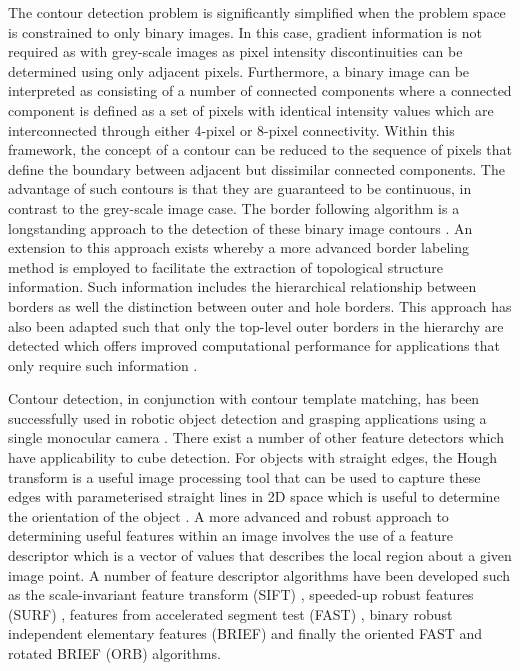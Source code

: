 The contour detection problem is significantly simplified when the problem space is constrained to only binary images. In this case, gradient information is not required as with grey-scale images as pixel intensity discontinuities can be determined using only adjacent pixels. Furthermore, a binary image can be interpreted as consisting of a number of connected components where a connected component is defined as a set of pixels with identical intensity values which are interconnected through either 4-pixel or 8-pixel connectivity. Within this framework, the concept of a contour can be reduced to the sequence of pixels that define the boundary between adjacent but dissimilar connected components. The advantage of such contours is that they are guaranteed to be continuous, in contrast to the grey-scale image case. The border following algorithm is a longstanding approach to the detection of these binary image contours \cite{Suzuki:Binary_Image_Topological_Structural_Analysis}. An extension to this approach exists whereby a more advanced border labeling method is employed to facilitate the extraction of topological structure information. Such information includes the hierarchical relationship between borders as well the distinction between outer and hole borders. This approach has also been adapted such that only the top-level outer borders in the hierarchy are detected which offers improved computational performance for applications that only require such information \cite{Yokoi:Binary_Image_Topological_Properties_Analysis}.

Contour detection, in conjunction with contour template matching, has been successfully used in robotic object detection and grasping applications using a single monocular camera \cite{Wei:Robotic_Object_Recognition_With_Natural_Background}. There exist a number of other feature detectors which have applicability to cube detection. For objects with straight edges, the Hough transform is a useful image processing tool that can be used to capture these edges with parameterised straight lines in 2D space which is useful to determine the orientation of the object \cite{Aggarwal:Line_Detection_Hough_Transform}. A more advanced and robust approach to determining useful features within an image involves the use of a feature descriptor which is a vector of values that describes the local region about a given image point. A number of feature descriptor algorithms have been developed such as the scale-invariant feature transform (SIFT) \cite{Lowe:Distinctive_Image_Features_from_Scale_Invariant_Keypoints}, speeded-up robust features (SURF) \cite{Bay:SURF_Speeded_Up_Robust_Features}, features from accelerated segment test (FAST) \cite{Rosten:Machine_Learning_for_High_Speed_Corner_Detection}, binary robust independent elementary features (BRIEF) \cite{Calonder:BRIEF_Binary_Robust_Independent_Elementary_Features} and finally the oriented FAST and rotated BRIEF (ORB) \cite{Rublee:ORB_Alternative_to_SIFT_or_SURF} algorithms.

